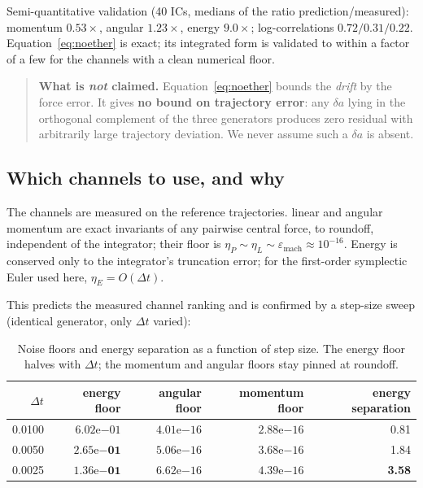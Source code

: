 \documentclass[11pt]{article}
\newcommand{\eps}{\varepsilon}
\begin{document}
Semi-quantitative validation (40 ICs, medians of the ratio prediction/measured):
momentum $0.53\times$, angular $1.23\times$, energy $9.0\times$; log-correlations
$0.72/0.31/0.22$. Equation~\eqref{eq:noether} is exact; its integrated form is
validated to within a factor of a few for the channels with a clean numerical floor.

\begin{quote}
\textbf{What is \emph{not} claimed.} Equation~\eqref{eq:noether} bounds the
\emph{drift} by the force error. It gives \textbf{no bound on trajectory error}: any
$\delta a$ lying in the orthogonal complement of the three generators produces zero
residual with arbitrarily large trajectory deviation. We never assume such a
$\delta a$ is absent.
\end{quote}

\subsection{Which channels to use, and why}
\label{sec:nf}

The channels are measured on the reference trajectories. linear and angular momentum
are exact invariants of any pairwise central force, to roundoff, independent of the
integrator; their floor is $\eta_P \sim \eta_L \sim \eps_{\text{mach}} \approx
10^{-16}$. Energy is conserved only to the integrator's truncation error; for the
first-order symplectic Euler used here, $\eta_E = O(\Delta t)$.

This predicts the measured channel ranking and is confirmed by a step-size sweep
(identical generator, only $\Delta t$ varied):

\begin{table}[t]
\centering
\small
\caption{Noise floors and energy separation as a function of step size. The energy
floor halves with $\Delta t$; the momentum and angular floors stay pinned at roundoff.}
\label{tab:noisefloor}
\begin{tabular}{rrrrr}
\toprule
$\Delta t$ & energy floor & angular floor & momentum floor & energy separation \\
\midrule
0.0100 & $6.02\mathrm{e}{-01}$ & $4.01\mathrm{e}{-16}$ & $2.88\mathrm{e}{-16}$ & 0.81 \\
0.0050 & $\mathbf{2.65\mathrm{e}{-01}}$ & $5.06\mathrm{e}{-16}$ & $3.68\mathrm{e}{-16}$ & 1.84 \\
0.0025 & $\mathbf{1.36\mathrm{e}{-01}}$ & $6.62\mathrm{e}{-16}$ & $4.39\mathrm{e}{-16}$ & \textbf{3.58} \\
\bottomrule
\end{tabular}
\end{table}
\end{document}
